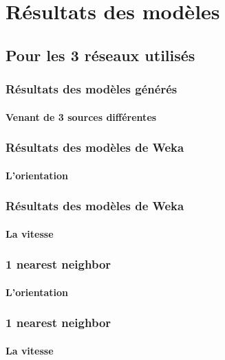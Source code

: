 \section{Résultats des modèles}
\subsection{Pour les 3 réseaux utilisés}

\begin{frame}
 \frametitle{Résultats des modèles générés}
 \framesubtitle{Venant de 3 sources différentes}
 
\end{frame}

\begin{frame}
 \frametitle{Résultats des modèles de Weka}
 \framesubtitle{L'orientation}
 
\end{frame}

\begin{frame}
 \frametitle{Résultats des modèles de Weka}
 \framesubtitle{La vitesse}
 
\end{frame}

\begin{frame}
 \frametitle{1 nearest neighbor}
 \framesubtitle{L'orientation}
 
\end{frame}

\begin{frame}
 \frametitle{1 nearest neighbor}
 \framesubtitle{La vitesse}
 
\end{frame}